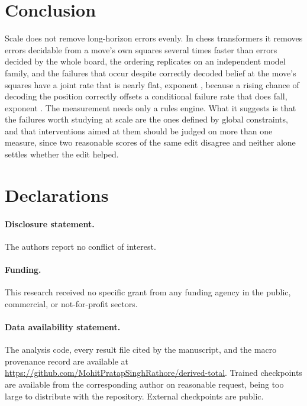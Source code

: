 \documentclass[11pt]{article}
\newif\ifanon
\begin{document}
\section{Conclusion}

Scale does not remove long-horizon errors evenly. In chess transformers it removes
errors decidable from a move's own squares several times faster than errors
decided by the whole board, the ordering replicates on an independent model family,
and the failures that occur despite correctly decoded belief at the move's squares
have a joint rate that is nearly flat, exponent , because a rising chance
of decoding the position correctly offsets a conditional failure rate that does fall,
exponent . The measurement needs only a rules engine. What it suggests is
that the failures worth studying at scale are the ones defined by global constraints,
and that interventions aimed at them should be judged on more than one measure, since
two reasonable scores of the same edit disagree and neither alone settles whether the
edit helped.

\section*{Declarations}

\paragraph{Disclosure statement.}
\ifanon Removed for double-anonymous peer review.
\else The authors report no conflict of interest. \fi

\paragraph{Funding.}
\ifanon Removed for double-anonymous peer review.
\else This research received no specific grant from any funding agency in the
public, commercial, or not-for-profit sectors. \fi

\paragraph{Data availability statement.}
\ifanon
The analysis code, every result file cited by the manuscript, and the macro
provenance record will be made available upon acceptance. External checkpoints are
public.
\else
The analysis code, every result file cited by the manuscript, and the macro
provenance record are available at
\url{https://github.com/MohitPratapSinghRathore/derived-total}. Trained checkpoints
are available from the corresponding author on reasonable request, being too large
to distribute with the repository. External checkpoints are public.
\fi
\end{document}
